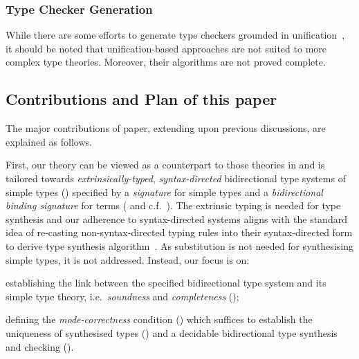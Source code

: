 \subsubsection{Type Checker Generation}
While there are some efforts to generate type checkers grounded in unification~\citep{Gast2004,Grewe2015}, it should be noted that unification-based approaches are not suited to more complex type theories.
Moreover, their algorithms are not proved complete.

\subsection{Contributions and Plan of this paper}
The major contributions of paper, extending upon previous discussions, are explained as follows.

First, our theory can be viewed as a counterpart to those theories in  and is tailored towards \emph{extrinsically-typed}, \emph{syntax-directed} bidirectional type systems of simple types () specified by a \emph{signature} for simple types and a \emph{bidirectional binding signature} for terms ( and c.f.\ ). 
The extrinsic typing is needed for type synthesis and our adherence to syntax-directed systems aligns with the standard idea of re-casting non-syntax-directed typing rules into their syntax-directed form to derive type synthesis algorithm~\citep{Peyton-Jones2007}.
As substitution is not needed for synthesising simple types, it is not addressed.
Instead, our focus is on:
\begin{enumerate*}
  \item establishing the link between the specified bidirectional type system and its simple type theory, i.e.\ \emph{soundness} and \emph{completeness} (); 
  \item defining the \emph{mode-correctness} condition () which suffices to establish the uniqueness of synthesised types () and a decidable bidirectional type synthesis and checking ().
\end{enumerate*}

